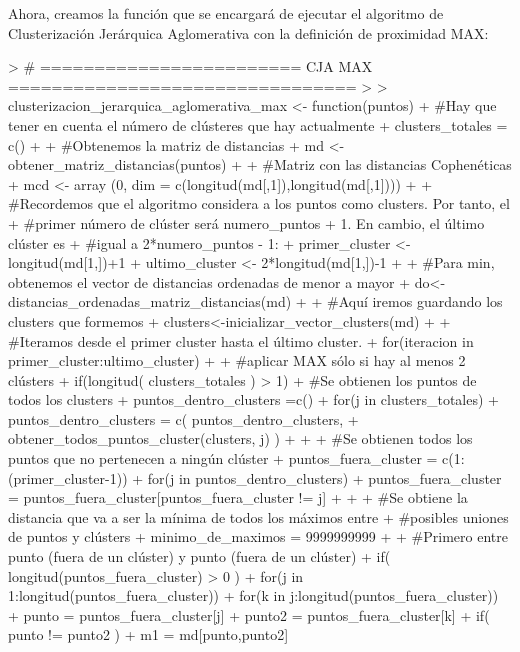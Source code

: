 \documentclass[parskip=full]{scrartcl}
\begin{document}
Ahora, creamos la función que se encargará de ejecutar el algoritmo de Clusterización Jerárquica Aglomerativa con la definición de proximidad MAX:


\begin{Schunk}
\begin{Sinput}
> # ======================== CJA MAX ================================
> 
> clusterizacion_jerarquica_aglomerativa_max <- function(puntos) {
+   #Hay que tener en cuenta el número de clústeres que hay actualmente
+   clusters_totales = c()
+   
+   #Obtenemos la matriz de distancias
+   md <- obtener_matriz_distancias(puntos)
+   
+   #Matriz con las distancias Cophenéticas
+   mcd <- array (0, dim = c(longitud(md[,1]),longitud(md[,1])))
+   
+   #Recordemos que el algoritmo considera a los puntos como clusters. Por tanto, el
+   #primer número de clúster será numero_puntos + 1. En cambio, el último clúster es
+   #igual a 2*numero_puntos - 1:
+   primer_cluster <- longitud(md[1,])+1
+   ultimo_cluster <- 2*longitud(md[1,])-1
+   
+   #Para min, obtenemos el vector de distancias ordenadas de menor a mayor
+   do<-distancias_ordenadas_matriz_distancias(md)
+   
+   #Aquí iremos guardando los clusters que formemos
+   clusters<-inicializar_vector_clusters(md)
+   
+   #Iteramos desde el primer cluster hasta el último cluster.
+   for(iteracion in primer_cluster:ultimo_cluster){
+     
+     #aplicar MAX sólo si hay al menos 2 clústers
+     if(longitud( clusters_totales ) > 1) {
+       #Se obtienen los puntos de todos los clusters
+       puntos_dentro_clusters =c()
+       for(j in clusters_totales) {
+         puntos_dentro_clusters = c( puntos_dentro_clusters, 
+         obtener_todos_puntos_cluster(clusters, j) )
+       }
+       
+       #Se obtienen todos los puntos que no pertenecen a ningún clúster
+       puntos_fuera_cluster = c(1:(primer_cluster-1))
+       for(j in puntos_dentro_clusters) {
+         puntos_fuera_cluster = puntos_fuera_cluster[puntos_fuera_cluster != j]
+       }
+       
+       #Se obtiene la distancia que va a ser la mínima de todos los máximos entre
+       #posibles uniones de puntos y clústers
+       minimo_de_maximos = 9999999999
+       
+       #Primero entre punto (fuera de un clúster) y punto (fuera de un clúster)
+       if( longitud(puntos_fuera_cluster) > 0 ) {
+         for(j in 1:longitud(puntos_fuera_cluster)){
+           for(k in j:longitud(puntos_fuera_cluster)){
+             punto = puntos_fuera_cluster[j]
+             punto2 = puntos_fuera_cluster[k] 
+             if( punto != punto2 ){ 
+               m1 = md[punto,punto2]
}}}}}}}
\end{Sinput}
\end{Schunk}
\end{document}

